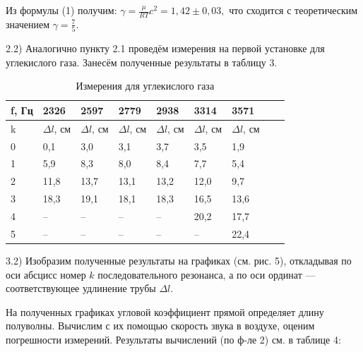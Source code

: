 \documentclass[a4paper,11pt]{extarticle} %
\begin{document}
		Из формулы (1) получим: $\gamma=\frac{\mu}{RT} c^2 = 1,42 \pm 0,03,$ что сходится с теоретическим значением $\gamma = \frac{7}{5}$.
		
		2.2) Аналогично пункту 2.1 проведём измерения на первой установке для углекислого газа. Занесём полученные результаты в таблицу 3.
		
		\begin{table}[ht!]
		\begin{center}
		\begin{tabular}{|l|l|l|l|l|l|l|l|l|}
			\hline
			f, Гц & 2326 & 2597 & 2779 & 2938  & 3314 & 3571
			\\
			\hline
			k &  $\Delta l$, см & $\Delta l$, см & $\Delta l$, см & $\Delta l$, см & $\Delta l$, см & $\Delta l$, см
			\\
			
			\hline
			0 & 0,1 & 3,0 & 3,1 & 3,7 & 3,5 & 1,9
			\\
			\hline
			1 & 5,9 & 8,3 & 8,0 & 8,4 & 7,7 & 5,4
			\\
			\hline
			2 & 11,8 & 13,7 & 13,1 & 13,2 & 12,0 & 9,7
			\\
			\hline
			3 & 18,3 & 19,1 & 18,1 & 18,3 & 16,5 & 13,6
			\\
			\hline
			4 & -- & -- & -- & -- & 20,2 & 17,7
			\\
			\hline
			5 & -- & -- & -- & -- & -- & 22,4
			\\
			\hline
		\end{tabular}
		\caption {Измерения для углекислого газа}
		\end{center}
		\end{table}
		
		3.2) Изобразим полученные результаты на графиках (см. рис. 5), откладывая по оси абсцисс номер $k$ последовательного резонанса, а по оси ординат — соответствующее удлинение трубы
		$\Delta l$.

		
		На полученных графиках угловой коэффициент прямой определяет длину полуволны. Вычислим с их помощью скорость звука в воздухе, оценим погрешности измерений. Результаты вычислений (по ф-ле 2) см. в таблице 4:
		
\end{document}
